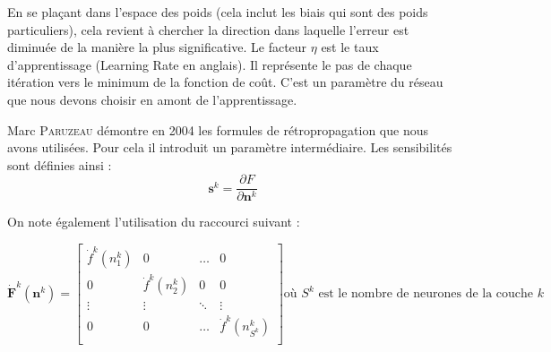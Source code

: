 En se plaçant dans l'espace des poids (cela inclut les biais qui sont des poids particuliers), cela revient à chercher la direction dans laquelle l'erreur
est diminuée de la manière la plus significative. Le facteur $\eta$ est le taux d'apprentissage (Learning Rate en anglais). Il représente le pas de
chaque itération vers le minimum de la fonction de coût. C'est un paramètre du réseau que nous devons choisir en amont de l'apprentissage.

Marc \textsc{Paruzeau} démontre en 2004 les formules de rétropropagation que nous avons utilisées. Pour cela il introduit un paramètre %
intermédiaire. Les sensibilités sont définies ainsi :
\begin{equation}
 \mathbf{s}^k = \frac{\partial F}{\partial \mathbf{n}^k}
\end{equation}

On note également l'utilisation du raccourci suivant : 

\begin{equation}
  \displaystyle
 \mathbf{\dot F}^k\left(\mathbf{n}^k\right) =
 \begin{bmatrix}
  \dot f ^k\left(n^k_1\right) & 0 & \ldots & 0\\
  0 & \dot f^k\left(n^k_2\right) & 0 & 0\\
  \vdots & \vdots & \ddots & \vdots \\
  0 & 0 & \ldots & \dot f^k\left(n^k_{S^k}\right)\\
 \end{bmatrix}
 \text{où $S^k$ est le nombre de neurones de la couche $k$}
\end{equation}


